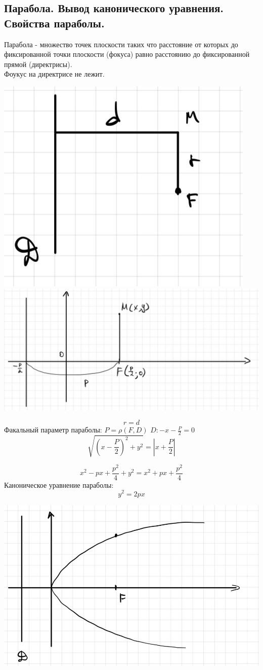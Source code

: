 \documentclass[12pt, paper]{article}
\begin{document}
\subsection{Парабола. Вывод канонического уравнения. Свойства параболы.}
\setcounter{equation}{0}
Парабола - множество точек плоскости таких что расстояние от которых до фиксированной точки плоскости (фокуса) равно расстоянию до фиксированной прямой (директрисы). \\
Фоукус на директрисе не лежит.\\

\begin{center}
	\includegraphics[width=0.4\linewidth]{images/Прямые 2 порядка/Парабола/Парабола 1.jpg}
	\includegraphics[width=0.55\linewidth]{images/Прямые 2 порядка/Парабола/Парабола 2.jpg}\\
\end{center}


\begin{equation}
	r = d
\end{equation}
Факальный параметр параболы: $P = \rho(F, D)$
$D: -x-\frac{P}{2} = 0$
\begin{equation}
	\sqrt{(x - \frac{P}{2})^2 + y^2} = |x + \frac{P}{2}| 
\end{equation}

\[ x^2 - px + \frac{p^2}{4} + y^2 = x^2 + px + \frac{p^2}{4} \]
Каноническое уравнение параболы:
\begin{equation}
	y^2 = 2px
\end{equation}

\begin{center}
	\includegraphics[width=0.5\linewidth]{images/Прямые 2 порядка/Парабола/Парабола 3.jpg}\\
\end{center}
\end{document}
